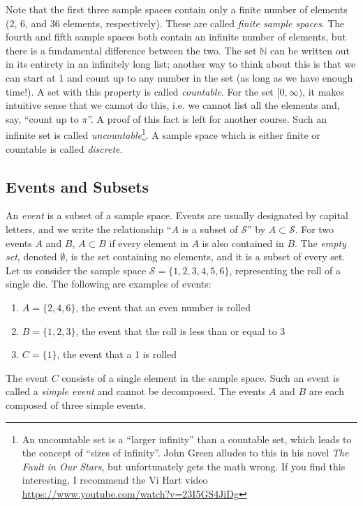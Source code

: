 \documentclass[12pt]{article}
\theoremstyle{definition}
\theoremstyle{remark}
\def\N{{\mathbb N}}
\def\cals{{\mathcal S}}
\begin{document}
Note that the first three sample spaces contain only a finite number of elements (2, 6, and 36 elements, respectively). These are called \emph{finite sample spaces}. The fourth and fifth sample spaces both contain an infinite number of elements, but there is a fundamental difference between the two. The set $\N$ can be written out in its entirety in an infinitely long list; another way to think about this is that we can start at 1 and count up to any number in the set (as long as we have enough time!). A set with this property is called \emph{countable}. For the set $[0, \infty)$, it makes intuitive sense that we cannot do this, i.e. we cannot list all the elements and, say, ``count up to $\pi$''. A proof of this fact is left for another course. Such an infinite set is called \emph{uncountable}\footnote{An uncountable set is a ``larger infinity'' than a countable set, which leads to the concept of ``sizes of infinity''. John Green alludes to this in his novel \emph{The Fault in Our Stars}, but unfortunately gets the math wrong. If you find this interesting, I recommend the Vi Hart video \url{https://www.youtube.com/watch?v=23I5GS4JiDg}}. A sample space which is either finite or countable is called \emph{discrete}.\\

\subsection{Events and Subsets}
An \emph{event} is a subset of a sample space. Events are usually designated by capital letters, and we write the relationship ``$A$ is a subset of $\cals$'' by $A \subset \cals$. For two events $A$ and $B$, $A \subset B$ if every element in $A$ is also contained in $B$. The \emph{empty set}, denoted $\emptyset$, is the set containing no elements, and it is a subset of every set.
\\

Let us consider the sample space $\cals = \{1, 2, 3, 4, 5, 6\}$, representing the roll of a single die. The following are examples of events:
\begin{enumerate}
\item $A = \{2, 4, 6\}$, the event that an even number is rolled
\item $B = \{1, 2, 3\}$, the event that the roll is less than or equal to 3
\item $C = \{1\}$, the event that a 1 is rolled
\end{enumerate}
The event $C$ consists of a single element in the sample space. Such an event is called a \emph{simple event} and cannot be decomposed. The events $A$ and $B$ are each composed of three simple events.\\
\end{document}

